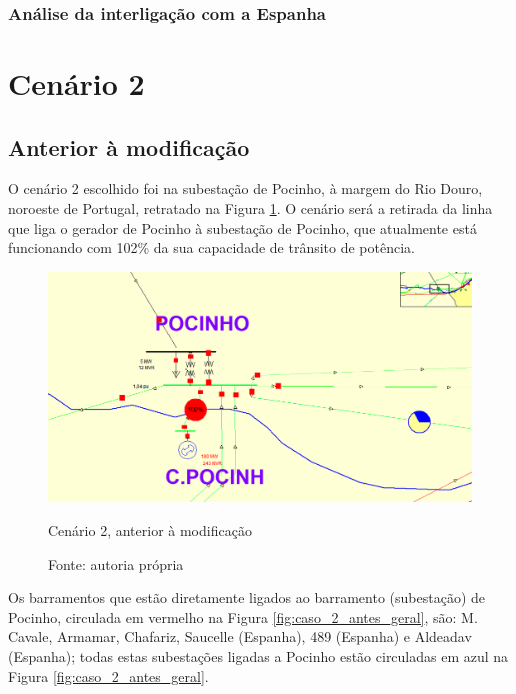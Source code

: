 \subsubsection{Análise da interligação com a Espanha}

\section{Cenário 2} %

\subsection{Anterior à modificação}
O cenário 2 escolhido foi na subestação de Pocinho, à margem do Rio Douro, noroeste de Portugal, retratado na Figura \ref{fig:caso_2_antes_geral_menor}. O cenário será a retirada da linha que liga o gerador de Pocinho à subestação de Pocinho, que atualmente está funcionando com 102\% da sua capacidade de trânsito de potência.

\begin{figure}[H]
	\centering
	\captionsetup{width=\textwidth, font=footnotesize, textfont=bf}	
	\includegraphics[width=\linewidth]{img/caso_2_antes_geral.PNG}
	\caption{Cenário 2, anterior à modificação}
	\vspace{-3.5mm}
	\caption*{Fonte: autoria própria}
	\label{fig:caso_2_antes_geral_menor}
\end{figure}

Os barramentos que estão diretamente ligados ao barramento (subestação) de Pocinho, circulada em vermelho na Figura \ref{fig:caso_2_antes_geral}, são: M. Cavale, Armamar, Chafariz, Saucelle (Espanha), 489 (Espanha) e Aldeadav (Espanha); todas estas subestações ligadas a Pocinho estão circuladas em azul na Figura \ref{fig:caso_2_antes_geral}.

